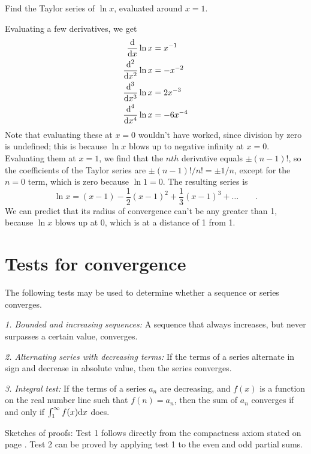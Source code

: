\begin{eg}
\egquestion
Find the Taylor series of $\ln x$, evaluated around $x=1$.

\eganswer
Evaluating a few derivatives, we get
\begin{align*}
  \frac{\textup{d}}{\textup{d} x}\ln x &= x^{-1} \\
  \frac{\textup{d}^2}{\textup{d} x^2}\ln x &= -x^{-2}\\
  \frac{\textup{d}^3}{\textup{d} x^3}\ln x &= 2x^{-3}\\
  \frac{\textup{d}^4}{\textup{d} x^4}\ln x &= -6x^{-4}
\end{align*}
Note that evaluating these at $x=0$ wouldn't have worked, since division by zero is undefined;
this is because $\ln x$ blows up to negative infinity at $x=0$. Evaluating them at $x=1$, we
find that the $nth$ derivative equals $\pm (n-1)!$, so the coefficients of the Taylor
series are $\pm (n-1)!/n!=\pm1/n$, except for the $n=0$ term, which is zero because
$\ln 1=0$. The resulting series is
\begin{equation*}
  \ln x = (x-1) - \frac{1}{2}(x-1)^2 + \frac{1}{3}(x-1)^3 + \ldots \qquad .
\end{equation*}
We can predict that its radius of convergence can't be any greater than 1, because
$\ln x$ blows up at 0, which is at a distance of 1 from 1.
\end{eg}

\section{Tests for convergence}

The following tests may be used to determine whether a sequence or series converges.

\emph{1. Bounded and increasing sequences\/:} A sequence that always increases, but never
surpasses a certain value, converges.

\emph{2. Alternating series with decreasing terms\/:} If the terms of a series alternate
in sign and decrease in absolute value, then the series converges.

\emph{3. Integral test\/:} If the terms of a series $a_n$ are decreasing, and $f(x)$ is a function
on the real number line such that $f(n)=a_n$, then the sum of $a_n$ converges if and only if
$\int_1^\infty f(x)\textup{d} x$ does.

Sketches of proofs: Test 1 follows directly from the compactness axiom stated on page \pageref{compactness}.
Test 2 can be proved by applying test 1 to the even and odd partial sums.

